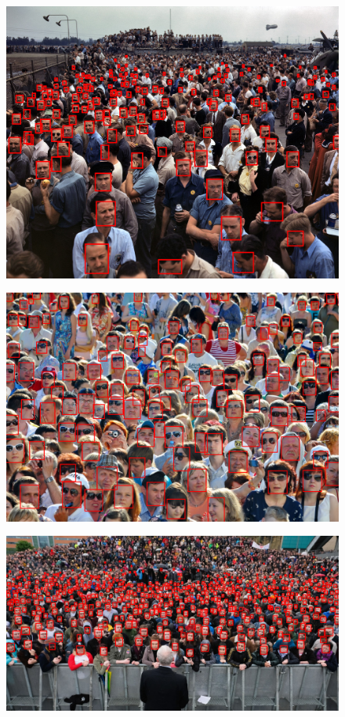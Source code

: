 \documentclass[17pt]{extarticle}
\begin{document}
  	
\newpage


\begin{figure}[h]
  		\includegraphics[scale=0.58]{resultscrowd.png}
\end{figure}

\begin{figure}[h]
  		\includegraphics[scale=0.41]{resultscrowd2.png}
\end{figure}

\begin{figure}[h]
  		\includegraphics[scale=0.45]{resultscrowd3.png}
\end{figure}
\end{document}
